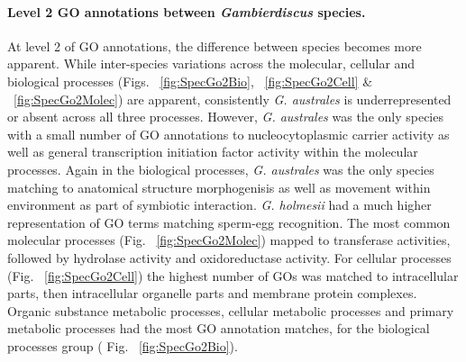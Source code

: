 \documentclass[12pt]{article}
\begin{document}
\paragraph{Level 2 GO annotations between \textit{Gambierdiscus} species.}
\FloatBarrier
At level 2 of GO annotations, the difference between species becomes more apparent. 
While inter-species variations across the molecular, cellular and biological processes (Figs. ~\ref{fig:SpecGo2Bio}, ~\ref{fig:SpecGo2Cell} \& ~\ref{fig:SpecGo2Molec}) are apparent, consistently \textit{G. australes} is underrepresented or absent across all three processes. 
However, \textit{G. australes} was the only species with a small number of GO annotations to nucleocytoplasmic carrier activity as well as general transcription initiation factor activity within the molecular processes. 
Again in the biological processes, \textit{G. australes} was the only species matching to anatomical structure morphogenisis as well as movement within environment as part of symbiotic interaction. 
\textit{G. holmesii} had a much higher representation of GO terms matching sperm-egg recognition. 
The most common molecular processes (Fig. ~\ref{fig:SpecGo2Molec}) mapped to transferase activities, followed by hydrolase activity and oxidoreductase activity. 
For cellular processes (Fig. ~\ref{fig:SpecGo2Cell}) the highest number of GOs was matched to intracellular parts, then intracellular organelle parts and membrane protein complexes. 
Organic substance metabolic processes, cellular metabolic processes and primary metabolic processes had the most GO annotation matches, for the biological processes group ( Fig. ~\ref{fig:SpecGo2Bio}). 
\end{document}
